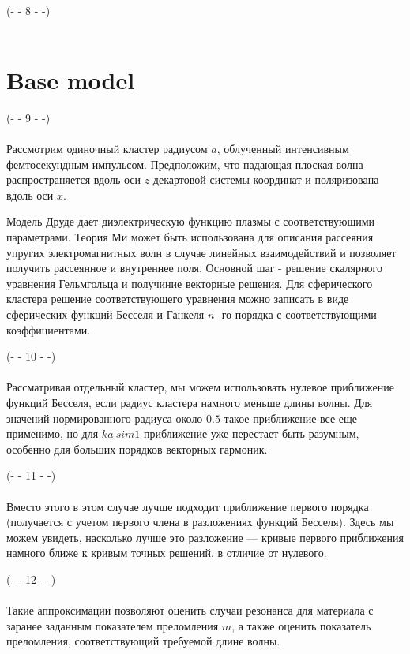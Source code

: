 \\\noindent(- - 8 - -)\\~\\
\section{Base model}

\noindent(- - 9 - -)\\~\\
Рассмотрим одиночный кластер радиусом $a$, облученный интенсивным фемтосекундным импульсом. Предположим, что падающая плоская волна распространяется вдоль оси $z$ декартовой системы координат и поляризована вдоль оси $x$. 

Модель Друде дает диэлектрическую функцию плазмы с соответствующими параметрами. Теория Ми может быть использована для описания рассеяния упругих электромагнитных волн в случае линейных взаимодействий и позволяет получить рассеянное и внутреннее поля. Основной шаг - решение скалярного уравнения Гельмгольца и получиние векторные решения. Для сферического кластера решение соответствующего уравнения можно записать в виде сферических функций Бесселя и Ганкеля $n$ -го порядка с соответствующими коэффициентами.

\noindent(- - 10 - -)\\~\\
Рассматривая отдельный кластер, мы можем использовать нулевое приближение функций Бесселя, если радиус кластера намного меньше длины волны. Для значений нормированного радиуса около $0.5$ такое приближение все еще применимо, но для $ka \ sim 1$ приближение уже перестает быть разумным, особенно для больших порядков векторных гармоник. 

\noindent(- - 11 - -)\\~\\
Вместо этого в этом случае лучше подходит приближение первого порядка (получается с учетом первого члена в разложениях функций Бесселя). Здесь мы можем увидеть, насколько лучше это разложение --- кривые первого приближения намного ближе к кривым точных решений, в отличие от нулевого. 

\noindent(- - 12 - -)\\~\\
Такие аппроксимации позволяют оценить случаи резонанса для материала с заранее заданным показателем преломления $m$, а также оценить показатель преломления, соответствующий требуемой длине волны.


